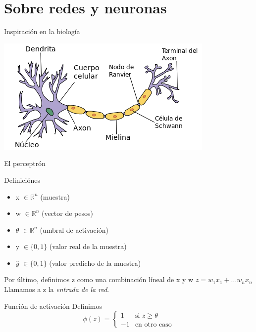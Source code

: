 \documentclass[presentation]{beamer}
\begin{document}
\section{Sobre redes y neuronas}
\label{sec:orgccbd527}
\begin{frame}[label={sec:org3a7f611}]{Inspiración en la biología}
\begin{center}
\includegraphics[width=.9\linewidth]{images/neurona.png}
\end{center}
\end{frame}

\begin{frame}[label={sec:orgea486d3}]{El perceptrón}
\begin{block}{Definiciónes}
\begin{itemize}
\item \alert{x} \(\in \mathbb{R}^n\) (muestra)
\item \alert{w} \(\in \mathbb{R}^n\) (vector de pesos)
\item \alert{\(\theta\)} \(\in \mathbb{R}^n\) (umbral de activación)
\item \alert{y} \(\in \{0, 1\}\) (valor real de la muestra)
\item \alert{\(\hat y\)} \(\in \{0, 1\}\) (valor predicho de la muestra)
\end{itemize}
Por último, definimos \alert{z} como una combinación líneal de \alert{x} y \alert{w}
\(z=w_1x_1+...w_nx_n\) \\
Llamamos a \alert{z} la \emph{entrada de la red}.
\pause
\end{block}
\begin{block}{Función de activación}
Definimos
\begin{equation*}
\phi(z)= \left\{ \begin{array} {rl} 1 & \text{si } z \geq \theta
\\ -1 & \text{en otro caso} \end{array} \right.
\end{equation*}
\end{block}
\end{frame}
\end{document}
